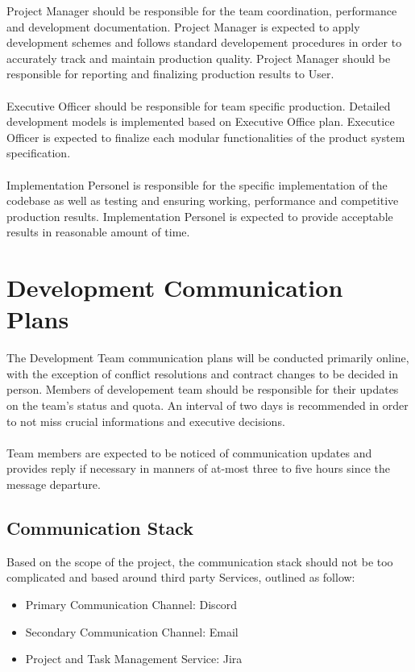     Project Manager should be responsible for the team coordination, performance and development documentation. 
    Project Manager is expected to apply development schemes and follows standard developement procedures in order to accurately
    track and maintain production quality.
    Project Manager should be responsible for reporting and finalizing production results to User.
    \\\\
    Executive Officer should be responsible for team specific production. Detailed development models is implemented based on Executive Office
    plan. Executice Officer is expected to finalize each modular functionalities of the product system specification.
    \\\\
    Implementation Personel is responsible for the specific implementation of the codebase as well as testing and ensuring working, performance and
    competitive production results. Implementation Personel is expected to provide acceptable results in reasonable amount of time.
    
    \section{Development Communication Plans}
    The Development Team communication plans will be conducted primarily online, with the exception of conflict resolutions and contract changes to be decided in person.
    Members of developement team should be responsible for their updates on the team's status and quota. An interval of two days is recommended in order to not miss crucial
    informations and executive decisions.
    \\\\
    Team members are expected to be noticed of communication updates and provides reply if necessary in manners of at-most three to five hours since the message departure.

        \subsection{Communication Stack}
        Based on the scope of the project, the communication stack should not be too complicated and based around third party Services, outlined as follow:
        \begin{itemize}
            \item Primary Communication Channel: Discord
            \item Secondary Communication Channel: Email
            \item Project and Task Management Service: Jira
        \end{itemize}

